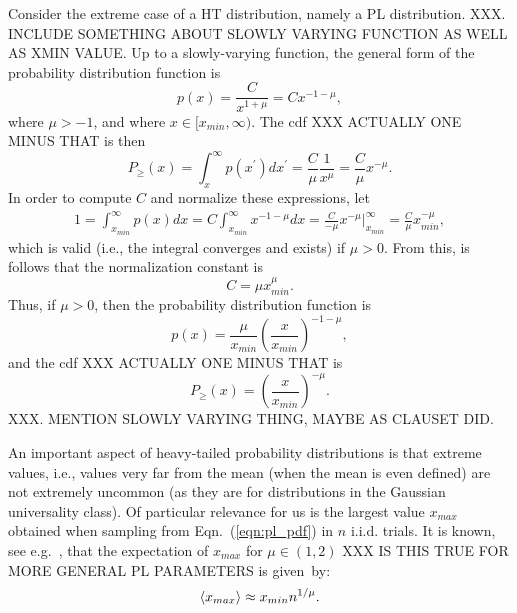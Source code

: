 {{Consider the extreme case of a HT distribution, namely a PL distribution.
XXX.  INCLUDE SOMETHING ABOUT SLOWLY VARYING FUNCTION AS WELL AS XMIN VALUE.
Up to a slowly-varying function, the general form of the probability distribution function is
$$
p(x) = \frac{C}{x^{1+\mu}}  = C x^{-1-\mu} , 
$$
where $\mu > -1$, and where $x \in [x_{min},\infty)$.
The cdf 
XXX ACTUALLY ONE MINUS THAT 
is then
$$
P_{\ge}(x) = \int_x^{\infty} p(x^{\prime}) dx^{\prime} 
           = \frac{C}{\mu} \frac{1}{x^{\mu}}  
           = \frac{C}{\mu} x^{-\mu}  .
$$
In order to compute $C$ and normalize these expressions, let
\begin{eqnarray*}
1 = \int_{x_{min}}^{\infty} p(x) dx 
  = C \int_{x_{min}}^{\infty} x^{-1-\mu} dx 
  = \frac{C}{-\mu} x^{-\mu} |_{x_{min}}^{\infty}  
  = \frac{C}{\mu} x_{min}^{-\mu}   ,
\end{eqnarray*}
which is valid (i.e., the integral converges and exists) if $\mu > 0$.
From this, is follows that the normalization constant is
\begin{equation}
C = \mu x_{min}^{\mu}  .
\label{eqn:pl_normalization}
\end{equation}
Thus, if $\mu > 0$, then the probability distribution function is 
\begin{equation}
p(x) 
     = \frac{\mu}{x_{min}}\left( \frac{x}{x_{min}}\right)^{-1-\mu}  ,
\label{eqn:pl_pdf}
\end{equation}
and the cdf 
XXX ACTUALLY ONE MINUS THAT
is 
\begin{equation}
P_{\ge}(x) 
           = \left( \frac{x}{x_{min}} \right)^{-\mu}  .
\label{eqn:pl_one_minus_cdf}
\end{equation}
XXX.  MENTION SLOWLY VARYING THING, MAYBE AS CLAUSET DID.

An important aspect of heavy-tailed probability distributions is that extreme values, i.e., values very far from the mean (when the mean is even defined) are not extremely uncommon (as they are for distributions in the Gaussian universality class).
Of particular relevance for us is the largest value $x_{max}$ obtained when sampling from Eqn.~(\ref{eqn:pl_pdf}) in $n$ i.i.d. trials.
It is known, see e.g.~\cite{SornetteBook,BouchaudPotters03,newman2005_zipf}, that the expectation of $x_{max}$ for $\mu\in(1,2)$ 
XXX IS THIS TRUE FOR MORE GENERAL PL PARAMETERS
is given~by:
$$
\mbox{}\langle x_{max}\rangle \approx x_{min} n^{1/\mu}  .
$$

}}
